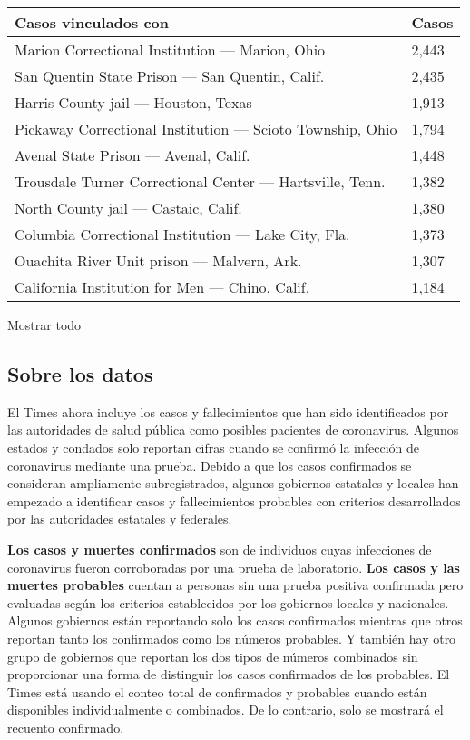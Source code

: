 \begin{longtable}[]{@{}ll@{}}
\toprule
Casos vinculados con & Casos\tabularnewline
\midrule
\endhead
Marion Correctional Institution --- Marion, Ohio & 2,443 \tabularnewline
San Quentin State Prison --- San Quentin, Calif. & 2,435 \tabularnewline
Harris County jail --- Houston, Texas & 1,913 \tabularnewline
Pickaway Correctional Institution --- Scioto Township, Ohio & 1,794
\tabularnewline
Avenal State Prison --- Avenal, Calif. & 1,448 \tabularnewline
Trousdale Turner Correctional Center --- Hartsville, Tenn. & 1,382
\tabularnewline
North County jail --- Castaic, Calif. & 1,380 \tabularnewline
Columbia Correctional Institution --- Lake City, Fla. & 1,373
\tabularnewline
Ouachita River Unit prison --- Malvern, Ark. & 1,307 \tabularnewline
California Institution for Men --- Chino, Calif. & 1,184 \tabularnewline
\bottomrule
\end{longtable}

Mostrar todo

\hypertarget{sobre-los-datos}{%
\subsection{Sobre los datos}\label{sobre-los-datos}}

El Times ahora incluye los casos y fallecimientos que han sido
identificados por las autoridades de salud pública como posibles
pacientes de coronavirus. Algunos estados y condados solo reportan
cifras cuando se confirmó la infección de coronavirus mediante una
prueba. Debido a que los casos confirmados se consideran ampliamente
subregistrados, algunos gobiernos estatales y locales han empezado a
identificar casos y fallecimientos probables con criterios desarrollados
por las autoridades estatales y federales.

\textbf{Los casos y muertes confirmados} son de individuos cuyas
infecciones de coronavirus fueron corroboradas por una prueba de
laboratorio. \textbf{Los casos y las muertes probables} cuentan a
personas sin una prueba positiva confirmada pero evaluadas según los
criterios establecidos por los gobiernos locales y nacionales. Algunos
gobiernos están reportando solo los casos confirmados mientras que otros
reportan tanto los confirmados como los números probables. Y también hay
otro grupo de gobiernos que reportan los dos tipos de números combinados
sin proporcionar una forma de distinguir los casos confirmados de los
probables. El Times está usando el conteo total de confirmados y
probables cuando están disponibles individualmente o combinados. De lo
contrario, solo se mostrará el recuento confirmado.

